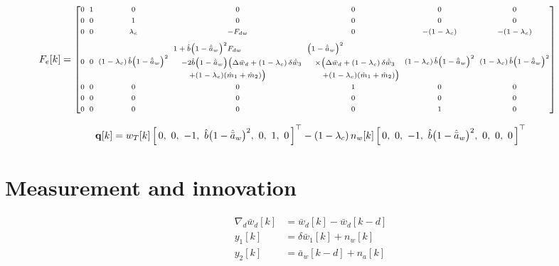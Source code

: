 \documentclass[11pt,a4paper,fontset=none]{ctexart}
\newcommand{\ba}{\bar{a}}
\newcommand{\bw}{\bar{w}}
\begin{document}
\begin{equation*}
\scriptsize
\setlength{\arraycolsep}{2.5pt}
\hspace*{-0.9cm}
F_e[k] =
\begin{bmatrix}
0 & 1 & 0 & 0 & 0 & 0 & 0 \\[0.4em]
0 & 0 & 1 & 0 & 0 & 0 & 0 \\[0.4em]
0 & 0 & \lambda_c & -F_{dw} & 0 & -(1-\lambda_c) & -(1-\lambda_c) \\[0.8em]
0 & 0 & (1-\lambda_c)\,\hat{b}\bigl(1-\hat{\ba}_w\bigr)^{2}
  & \begin{array}{@{}l@{}}
      1 + \hat{b}\bigl(1-\hat{\ba}_w\bigr)^{2}F_{dw} \\[0.5em]
      \quad - 2\hat{b}\bigl(1-\hat{\ba}_w\bigr)
        \bigl(\Delta\bw_d + (1-\lambda_c)\,\delta\hat{\bw}_3 \\[0.3em]
      \qquad + (1-\lambda_c)(\hat{m}_1 + \hat{m}_2)\bigr)
    \end{array}
  & \begin{array}{@{}l@{}}
      \bigl(1-\hat{\ba}_w\bigr)^{2} \\[0.5em]
      \quad \times \bigl(\Delta\bw_d + (1-\lambda_c)\,\delta\hat{\bw}_3 \\[0.3em]
      \qquad + (1-\lambda_c)(\hat{m}_1 + \hat{m}_2)\bigr)
    \end{array}
  & (1-\lambda_c)\,\hat{b}\bigl(1-\hat{\ba}_w\bigr)^{2}
  & (1-\lambda_c)\,\hat{b}\bigl(1-\hat{\ba}_w\bigr)^{2} \\[2.2em]
0 & 0 & 0 & 0 & 1 & 0 & 0 \\[0.4em]
0 & 0 & 0 & 0 & 0 & 0 & 0 \\[0.4em]
0 & 0 & 0 & 0 & 0 & 1 & 0
\end{bmatrix}
\end{equation*}

\begin{equation*}
\mathbf{q}[k] = w_T[k]\,\Bigl[\,0,\ 0,\ -1,\
\hat{b}\bigl(1-\hat{\ba}_w\bigr)^{2},\ 0,\ 1,\ 0\,\Bigr]^{\top}
 - (1-\lambda_c)\,n_w[k]\,\Bigl[\,0,\ 0,\ -1,\
\hat{b}\bigl(1-\hat{\ba}_w\bigr)^{2},\ 0,\ 0,\ 0\,\Bigr]^{\top}
\end{equation*}

\section{Measurement and innovation}

\begin{align*}
\nabla_d\bw_d[k] &= \bw_d[k] - \bw_d[k-d] \\
y_1[k] &= \delta\bw_1[k] + n_w[k] \\
y_2[k] &= \ba_w[k-d] + n_a[k]
\end{align*}
\end{document}
